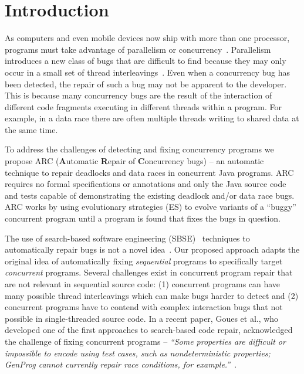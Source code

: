 \section{Introduction}
\label{sec:introduction}

As computers and even mobile devices now ship with more than one processor, programs
must take advantage of parallelism or concurrency~\cite{SL05}. Parallelism introduces a new class of bugs
that are difficult to find because they may only occur in a small set of
thread interleavings~\cite{MQB07}. Even when a concurrency bug has been
detected, the repair of such a bug may not be apparent to the developer. This is because many concurrency bugs are the result of the interaction of different code fragments executing in different threads within a program. For example, in a data race there are often multiple threads writing to shared data at the same time.

To address the challenges of detecting and fixing concurrency programs we propose ARC (\textbf{A}utomatic \textbf{R}epair of \textbf{C}oncurrency
bugs) -- an automatic technique to repair deadlocks and data races in concurrent
Java programs. ARC requires no formal specifications or annotations and only the Java source code and tests capable of demonstrating the existing deadlock
and/or data race bugs. ARC works by using evolutionary strategies (ES) to
evolve variants of a ``buggy'' concurrent program until a program is found that fixes the bugs in
question.

The use of search-based software engineering (SBSE)~\cite{Har+10} techniques to
automatically repair bugs is not a novel idea~\cite{FNWG09, WNLF09, NWLF09,
WFGN10, GNFW11, LDFW12}. Our proposed approach adapts the original idea of
automatically fixing \textit{sequential} programs to specifically target
\textit{concurrent} programs. Several challenges exist in concurrent program repair  that are not relevant in sequential source code: (1) concurrent programs can have many possible thread interleavings which can make bugs harder to detect and (2) concurrent programs have to contend with complex interaction bugs that not possible in single-threaded source code. In a recent paper, Goues et al., who developed one of the first approaches to search-based code repair, acknowledged the challenge of fixing concurrent programs -- \textit{``Some properties are difficult or impossible to encode using test cases, such as nondeterministic properties; GenProg cannot currently repair race conditions, for example.''}~\cite{GNFW11}.

